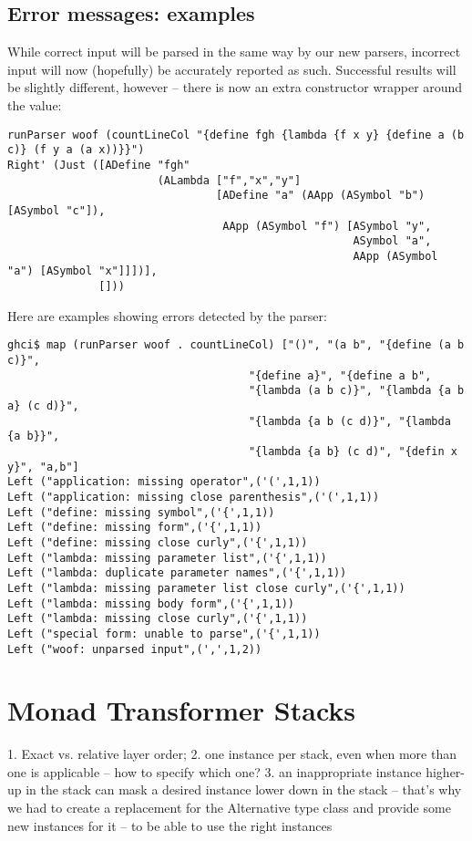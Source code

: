 \documentclass{tmr}
\begin{document}
\subsection{Error messages:  examples}
While correct input will be parsed in the same way by our new parsers, incorrect input will now (hopefully) be
accurately reported as such.  Successful results will be slightly different, however -- there is now an extra
constructor wrapper around the value:
\begin{verbatim}
runParser woof (countLineCol "{define fgh {lambda {f x y} {define a (b c)} (f y a (a x))}}")
Right' (Just ([ADefine "fgh" 
                       (ALambda ["f","x","y"] 
                                [ADefine "a" (AApp (ASymbol "b") [ASymbol "c"]),
                                 AApp (ASymbol "f") [ASymbol "y",
                                                     ASymbol "a",
                                                     AApp (ASymbol "a") [ASymbol "x"]]])],
              []))
\end{verbatim}
Here are examples showing errors detected by the parser:
\begin{verbatim}
ghci$ map (runParser woof . countLineCol) ["()", "(a b", "{define (a b c)}",  
                                     "{define a}", "{define a b", 
                                     "{lambda (a b c)}", "{lambda {a b a} (c d)}", 
                                     "{lambda {a b (c d)}", "{lambda {a b}}", 
                                     "{lambda {a b} (c d)", "{defin x y}", "a,b"]
Left ("application: missing operator",('(',1,1))
Left ("application: missing close parenthesis",('(',1,1))
Left ("define: missing symbol",('{',1,1))
Left ("define: missing form",('{',1,1))
Left ("define: missing close curly",('{',1,1))
Left ("lambda: missing parameter list",('{',1,1))
Left ("lambda: duplicate parameter names",('{',1,1))
Left ("lambda: missing parameter list close curly",('{',1,1))
Left ("lambda: missing body form",('{',1,1))
Left ("lambda: missing close curly",('{',1,1))
Left ("special form: unable to parse",('{',1,1))
Left ("woof: unparsed input",(',',1,2))
\end{verbatim}



\section{Monad Transformer Stacks}

1. Exact vs. relative layer order; 
2. one instance per stack, even when more than one is applicable --
how to specify which one?
3. an inappropriate instance higher-up in the stack can mask a 
desired instance lower down in the stack -- that's why we had to
create a replacement for the Alternative type class and provide
some new instances for it -- to be able to use the right instances
\end{document}
